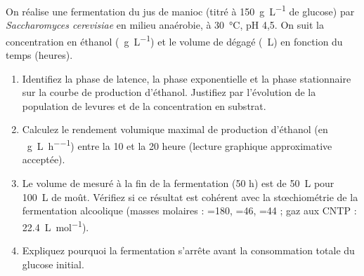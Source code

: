 \documentclass[11pt]{article}
\begin{document}
\begin{exercice}
On réalise une fermentation du jus de manioc (titré à \SI{150}{\gram\per\liter} de glucose) par \emph{Saccharomyces cerevisiae} en milieu anaérobie, à \SI{30}{\celsius}, pH 4,5. On suit la concentration en éthanol (\SI{}{\gram\per\liter}) et le volume de  dégagé (\SI{}{\liter}) en fonction du temps (heures).
\begin{center}
\end{center}
\begin{enumerate}
    \item Identifiez la phase de latence, la phase exponentielle et la phase stationnaire sur la courbe de production d'éthanol. Justifiez par l'évolution de la population de levures et de la concentration en substrat.
    \item Calculez le rendement volumique maximal de production d'éthanol (en \SI{}{\gram\per\liter\per\hour}) entre la 10 et la 20 heure (lecture graphique approximative acceptée).
    \item Le volume de  mesuré à la fin de la fermentation (50 h) est de \SI{50}{\liter} pour \SI{100}{\liter} de moût. Vérifiez si ce résultat est cohérent avec la stœchiométrie de la fermentation alcoolique (masses molaires : =180, =46, =44 ;  gaz aux CNTP : \SI{22,4}{\liter\per\mole}).
    \item Expliquez pourquoi la fermentation s'arrête avant la consommation totale du glucose initial.
\end{enumerate}
\end{exercice}
\end{document}
